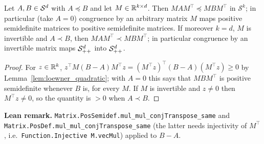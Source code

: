 \begin{lemma}\label{lem:loewner_congruence}
\leanok
{}
Let $A, B \in \mathcal{S}^{d}$ with $A \preceq B$ and let $M \in \mathbb{R}^{k \times d}$. Then
$M A M^\top \preceq M B M^\top$ in $\mathcal{S}^k$; in particular (take $A = 0$) congruence by
an arbitrary matrix $M$ maps positive semidefinite matrices to positive semidefinite matrices.
If moreover $k = d$, $M$ is invertible and
$A \prec B$, then $M A M^\top \prec M B M^\top$; in particular congruence by an invertible
matrix maps $\mathcal{S}_{++}^{d}$ into $\mathcal{S}_{++}^{d}$.
\end{lemma}

\begin{proof}
\leanok
{}
For $z \in \mathbb{R}^k$, $z^\top M (B-A) M^\top z = (M^\top z)^\top (B - A) (M^\top z) \ge 0$ by
Lemma~\ref{lem:loewner_quadratic}; with $A = 0$ this says that $MBM^\top$ is positive
semidefinite whenever $B$ is, for every $M$. If $M$ is invertible and $z \ne 0$ then $M^\top z \ne 0$, so
the quantity is $> 0$ when $A \prec B$.
\end{proof}

\textbf{Lean remark.} \texttt{Matrix.PosSemidef.mul\_mul\_conjTranspose\_same} and
\texttt{Matrix.PosDef.mul\_mul\_conjTranspose\_same} (the latter needs injectivity of
$M^\top$, i.e.\ \texttt{Function.Injective M.vecMul}) applied to $B - A$.

